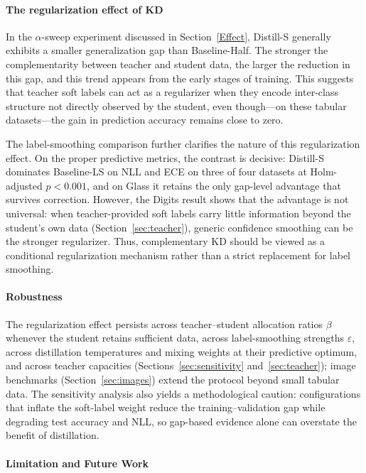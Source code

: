 \documentclass[a4paper,fleqn]{cas-dc}
\begin{document}
\paragraph{The regularization effect of KD}

In the $\alpha$-sweep experiment discussed in Section~\ref{Effect}, Distill-S generally exhibits a smaller generalization gap than Baseline-Half. The stronger the complementarity between teacher and student data, the larger the reduction in this gap, and this trend appears from the early stages of training. This suggests that teacher soft labels can act as a regularizer when they encode inter-class structure not directly observed by the student, even though---on these tabular datasets---the gain in prediction accuracy remains close to zero.

The label-smoothing comparison further clarifies the nature of this
regularization effect. On the proper predictive metrics, the contrast is
decisive: Distill-S dominates Baseline-LS on NLL and ECE on three of four
datasets at Holm-adjusted $p<0.001$, and on Glass it retains the only
gap-level advantage that survives correction. However, the Digits result
shows that the advantage is not universal: when teacher-provided soft
labels carry little information beyond the student's own data
(Section~\ref{sec:teacher}), generic confidence smoothing can be the
stronger regularizer. Thus, complementary KD should be viewed as a
conditional regularization mechanism rather than a strict replacement for
label smoothing.

\paragraph{Robustness}

The regularization effect persists across teacher--student allocation
ratios $\beta$ whenever the student retains sufficient data, across
label-smoothing strengths $\varepsilon$, across distillation temperatures
and mixing weights at their predictive optimum, and across teacher
capacities (Sections~\ref{sec:sensitivity} and~\ref{sec:teacher}); image
benchmarks (Section~\ref{sec:images}) extend the protocol beyond small
tabular data. The sensitivity analysis also yields a methodological
caution: configurations that inflate the soft-label weight reduce the
training--validation gap while degrading test accuracy and NLL, so
gap-based evidence alone can overstate the benefit of distillation.


\paragraph{Limitation and Future Work}
\end{document}
